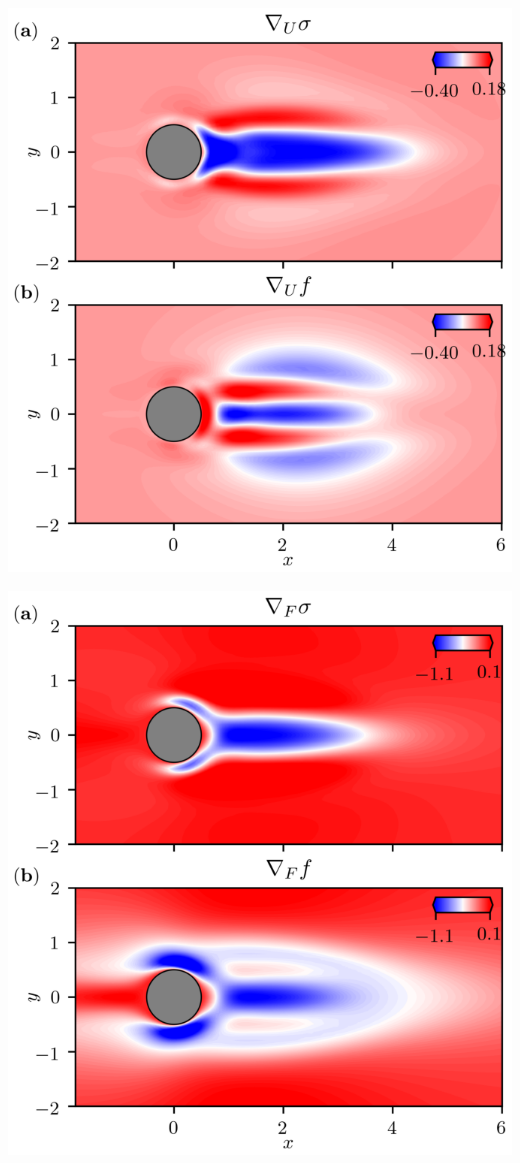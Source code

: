 \documentclass[aspectratio=169, usenames, dvipsnames]{beamer}
\begin{document}
{

  \begin{frame}
    \vfill
    \begin{minipage}{.48\textwidth}
      \includegraphics[width=\textwidth]{fig15}
    \end{minipage}%
    \hfill
    \begin{minipage}{.48\textwidth}
      \includegraphics[width=\textwidth]{fig16}

\end{minipage}
\end{frame}}
\end{document}
